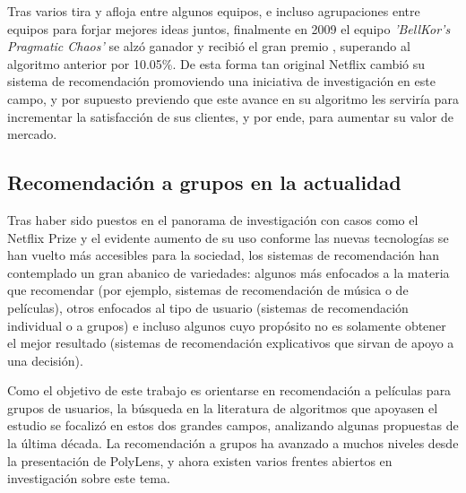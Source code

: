Tras varios tira y afloja entre algunos equipos, e incluso agrupaciones entre equipos para forjar mejores ideas juntos, finalmente en 2009 el equipo \textit{'BellKor's Pragmatic Chaos'} se alzó ganador y recibió el gran premio \cite{netflix-prize-winner}, superando al algoritmo anterior por 10.05\%. De esta forma tan original Netflix cambió su sistema de recomendación promoviendo una iniciativa de investigación en este campo, y por supuesto previendo que este avance en su algoritmo les serviría para incrementar la satisfacción de sus clientes, y por ende, para aumentar su valor de mercado.

\subsection{Recomendación a grupos en la actualidad}

Tras haber sido puestos en el panorama de investigación con casos como el Netflix Prize y el evidente aumento de su uso conforme las nuevas tecnologías se han vuelto más accesibles para la sociedad, los sistemas de recomendación han contemplado un gran abanico de variedades: algunos más enfocados a la materia que recomendar (por ejemplo, sistemas de recomendación de música o de películas), otros enfocados al tipo de usuario (sistemas de recomendación individual o a grupos) e incluso algunos cuyo propósito no es solamente obtener el mejor resultado (sistemas de recomendación explicativos que sirvan de apoyo a una decisión).

Como el objetivo de este trabajo es orientarse en recomendación a películas para grupos de usuarios, la búsqueda en la literatura de algoritmos que apoyasen el estudio se focalizó en estos dos grandes campos, analizando algunas propuestas de la última década. La recomendación a grupos ha avanzado a muchos niveles desde la presentación de PolyLens, y ahora existen varios frentes abiertos en investigación sobre este tema.

